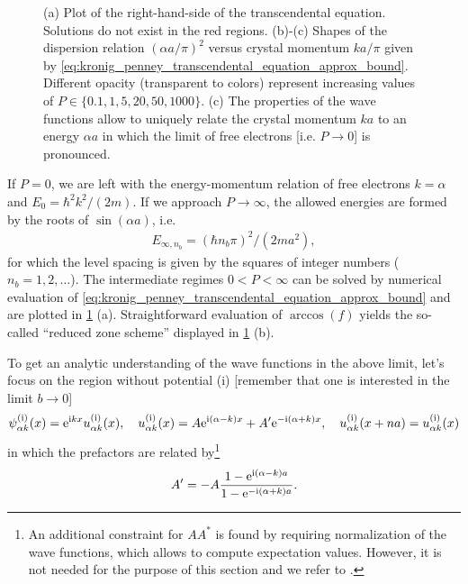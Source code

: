 \begin{figure}
    \caption{
    (a) Plot of the right-hand-side of the transcendental equation. Solutions do not exist in the red regions.
    (b)-(c) Shapes of the dispersion relation $(\alpha a/\pi)^2$ versus crystal momentum $ka/\pi$ given by \cref{eq:kronig_penney_transcendental_equation_approx_bound}.
    Different opacity (transparent to colors) represent increasing values of $P\in\{0.1,1,5,20,50,1000\}$.
    (c) The properties of the wave functions allow to uniquely relate the crystal momentum $ka$ to an energy $\alpha a$ in which the limit of free electrons [i.e. $P\rightarrow0$] is pronounced.}
    \label{fig:kronig_penney_dispersion}
\end{figure}

If $P=0$, we are left with the energy-momentum relation of free electrons $k=\alpha$ and $E_0={\hbar^2k^2}/({2m})$.
If we approach $P\rightarrow\infty$, the allowed energies are formed by the roots of $\sin(\alpha a)$, i.e.
\begin{align}
    E_{\infty,n_b}=(\hbar n_b\pi)^2/(2ma^2),
    \label{eq:kronig_penney_energy_tb}
\end{align}
for which the level spacing is given by the squares of integer numbers ($n_b=1,2,\dots$).
The intermediate regimes $0<P<\infty$ can be solved by numerical evaluation of \cref{eq:kronig_penney_transcendental_equation_approx_bound} and are plotted in \cref{fig:kronig_penney_dispersion} (a).
Straightforward evaluation of $\arccos(f)$ yields the so-called ``reduced zone scheme'' displayed in \cref{fig:kronig_penney_dispersion} (b).

To get an analytic understanding of the wave functions in the above limit, let's focus on the region without potential (i) [remember that one is interested in the limit $b\rightarrow0$]
\begin{align}
    \psi_{\alpha k}^{\rm (i)}(x) = \mathrm e^{\mathrm i kx}u_{\alpha k}^{\rm (i)}(x),
    \quad
    u_{\alpha k}^{\rm (i)}(x) = A\mathrm e^{\mathrm i(\alpha-k) x} + A'\mathrm e^{-\mathrm i(\alpha+k) x},
    \quad
    u_{\alpha k}^{\rm (i)}(x+na)=u_{\alpha k}^{\rm (i)}(x)
    \label{eq:kronig_penney_wavefunctions}
\end{align}
in which the prefactors are related by\footnote{An additional constraint for $AA^*$ is found by requiring normalization of the wave functions, which allows to compute expectation values. However, it is not needed for the purpose of this section and we refer to \cite{KronigPenney1931}.}
\begin{align}
    A' = -A\frac{1-\mathrm e^{\mathrm i(\alpha-k)a}}{1-\mathrm e^{-\mathrm i(\alpha+k)a}}.
    \label{eq:kronig_penney_constants}
\end{align}

